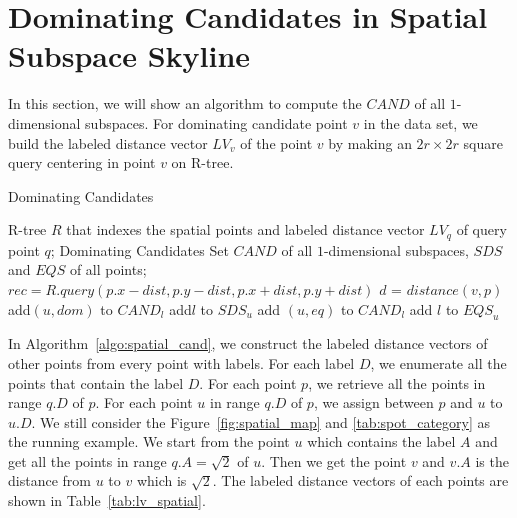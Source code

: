 \section{Dominating Candidates in Spatial Subspace Skyline}

In this section, we will show an algorithm to compute the $\mathit{CAND}$ of all $1$-dimensional subspaces. For dominating candidate point $v$ in the data set, we build the labeled distance vector $LV_v$ of the point $v$ by making an $2r \times 2r$ square query centering in point $v$ on R-tree.

\begin{algorithm}[H]
  \caption{Dominating Candidates}
  \label{algo:spatial_cand}
  \begin{algorithmic}[1]
  \show\LOOP
    \REQUIRE R-tree $R$ that indexes the spatial points and labeled distance vector $LV_q$ of query point $q$;
    \ENSURE Dominating Candidates Set $\mathit{CAND}$ of all $1$-dimensional subspaces, $\mathit{SDS}$ and $\mathit{EQS}$ of all points;
            \STATE $rec = R.query(p.x-dist, p.y-dist, p.x+dist, p.y+dist)$
                \STATE $d$ = $distance(v, p)$
                    \STATE add$(u, dom)$ to $\mathit{CAND}_l$
                    \STATE add$l$ to $\mathit{SDS}_u$
                \ENDIF
                    \STATE add $(u, eq)$ to $\mathit{CAND}_l$
                    \STATE add $l$ to $\mathit{EQS}_u$
                \ENDIF
            \ENDFOR
            
        \ENDFOR
    \ENDFOR
  \end{algorithmic}
\end{algorithm}

In Algorithm~\ref{algo:spatial_cand}, we construct the labeled distance vectors of other points from every point with labels. For each label $D$, we enumerate all the points that contain the label $D$. For each point $p$, we retrieve all the points in range $q.D$ of $p$. For each point $u$ in range $q.D$ of $p$, we assign between $p$ and $u$ to $u.D$. 
We still consider the Figure~\ref{fig:spatial_map} and \ref{tab:spot_category} as the running example. We start from the point $u$ which contains the label $A$ and get all the points in range $q.A = \sqrt{2}$ of $u$. Then we get the point $v$ and $v.A$ is the distance from $u$ to $v$ which is $\sqrt{2}$. The labeled distance vectors of each points are shown in Table~\ref{tab:lv_spatial}.

